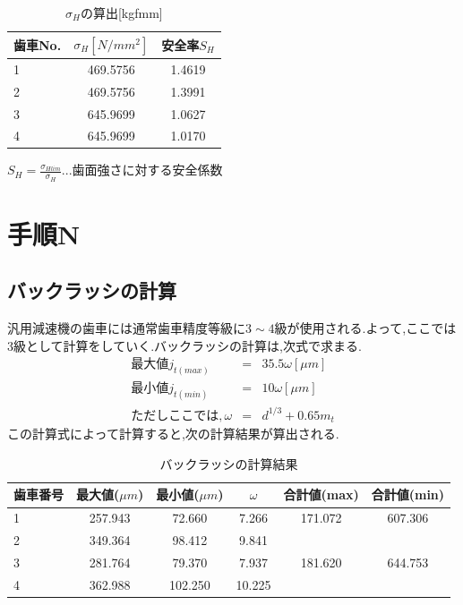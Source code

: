 \documentclass[a4j,twoside,openright,11pt]{jreport}
\begin{document}
\begin{table}[htb]
\begin{center}
  \caption{$\sigma_H$の算出[kgfmm]}
  \begin{tabular}{|l|c|c|} \hline
    歯車No.&$\sigma_H[N/mm^2]$&安全率$S_H$\\\hline
    1      &469.5756  &1.4619\\
    2      &469.5756  &1.3991\\
    3      &645.9699  &1.0627\\
    4      &645.9699  &1.0170\\
    \hline
  \end{tabular}
\end{center}
\end{table}
$S_H=\frac{\sigma_{Hlim}}{\sigma_{H}}...歯面強さに対する安全係数$\\
\section{手順N}
\subsection{バックラッシの計算}
汎用減速機の歯車には通常歯車精度等級に$3\sim 4$級が使用される.よって,ここでは3級として計算をしていく.バックラッシの計算は,次式で求まる.
\begin{eqnarray}
最大値　j_{t(max)}&=&35.5 \omega  [\mu m]\nonumber\\
最小値　j_{t(min)}&=&10 \omega  [\mu m]\nonumber\\
ただしここでは, \omega &=& d^{1/3} + 0.65 m_t\nonumber
\end{eqnarray}
この計算式によって計算すると,次の計算結果が算出される.
\begin{table}[htb]
\begin{center}
  \caption{バックラッシの計算結果}
  \begin{tabular}{|l||c|c|c|c|c|} \hline
歯車番号&最大値($\mu m$)&最小値($\mu m$)&$\omega$&合計値(max)&合計値(min)\\\hline
1&257.943& 72.660& 7.266&171.072	&607.306\\
2&349.364& 98.412& 9.841&&\\
3&281.764& 79.370& 7.937&181.620	&644.753\\
4&362.988&102.250&10.225&&\\
\hline
  \end{tabular}
\end{center}
\end{table}
\end{document}
